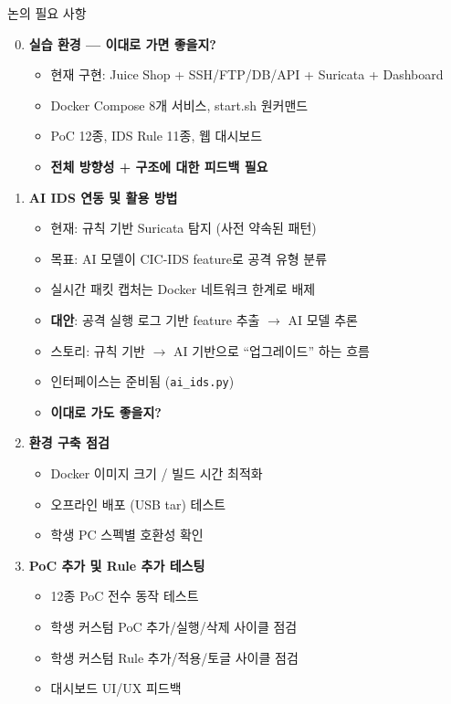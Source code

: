 \documentclass[aspectratio=169,10pt]{beamer}
\newcommand{\hlt}[1]{\textcolor{accent}{\textbf{#1}}}
\newcommand{\red}[1]{\textcolor{redTeam}{\textbf{#1}}}
\begin{document}
\begin{frame}{논의 필요 사항}
\begin{enumerate}
\setcounter{enumi}{-1}
    \item \textbf{실습 환경 — 이대로 가면 좋을지?}
    \begin{itemize}
        \item 현재 구현: Juice Shop + SSH/FTP/DB/API + Suricata + Dashboard
        \item Docker Compose 8개 서비스, start.sh 원커맨드
        \item PoC 12종, IDS Rule 11종, 웹 대시보드
        \item \red{전체 방향성 + 구조에 대한 피드백 필요}
    \end{itemize}

    \item \textbf{AI IDS 연동 및 활용 방법}
    \begin{itemize}
        \item 현재: 규칙 기반 Suricata 탐지 (사전 약속된 패턴)
        \item 목표: AI 모델이 CIC-IDS feature로 공격 유형 분류
        \item 실시간 패킷 캡처는 Docker 네트워크 한계로 배제
        \item \hlt{대안}: 공격 실행 로그 기반 feature 추출 $\rightarrow$ AI 모델 추론
        \item 스토리: 규칙 기반 $\rightarrow$ AI 기반으로 ``업그레이드'' 하는 흐름
        \item 인터페이스는 준비됨 (\texttt{ai\_ids.py})
        \item \red{이대로 가도 좋을지?}
    \end{itemize}

    \item \textbf{환경 구축 점검}
    \begin{itemize}
        \item Docker 이미지 크기 / 빌드 시간 최적화
        \item 오프라인 배포 (USB tar) 테스트
        \item 학생 PC 스펙별 호환성 확인
    \end{itemize}

    \item \textbf{PoC 추가 및 Rule 추가 테스팅}
    \begin{itemize}
        \item 12종 PoC 전수 동작 테스트
        \item 학생 커스텀 PoC 추가/실행/삭제 사이클 점검
        \item 학생 커스텀 Rule 추가/적용/토글 사이클 점검
        \item 대시보드 UI/UX 피드백
    \end{itemize}
\end{enumerate}
\end{frame}
\end{document}

